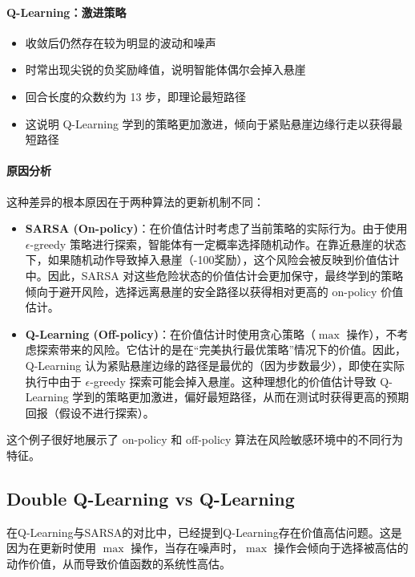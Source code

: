 \documentclass[oneside]{ctexbook}
\begin{document}
\paragraph{Q-Learning：激进策略}
\begin{itemize}
    \item 收敛后仍然存在较为明显的波动和噪声
    \item 时常出现尖锐的负奖励峰值，说明智能体偶尔会掉入悬崖
    \item 回合长度的众数约为 13 步，即理论最短路径
    \item 这说明 Q-Learning 学到的策略更加激进，倾向于紧贴悬崖边缘行走以获得最短路径
\end{itemize}

\paragraph{原因分析}

这种差异的根本原因在于两种算法的更新机制不同：

\begin{itemize}
    \item \textbf{SARSA (On-policy)}：在价值估计时考虑了当前策略的实际行为。由于使用 $\epsilon$-greedy 策略进行探索，智能体有一定概率选择随机动作。在靠近悬崖的状态下，如果随机动作导致掉入悬崖（-100奖励），这个风险会被反映到价值估计中。因此，SARSA 对这些危险状态的价值估计会更加保守，最终学到的策略倾向于避开风险，选择远离悬崖的安全路径以获得相对更高的 on-policy 价值估计。
    
    \item \textbf{Q-Learning (Off-policy)}：在价值估计时使用贪心策略（$\max$ 操作），不考虑探索带来的风险。它估计的是在“完美执行最优策略”情况下的价值。因此，Q-Learning 认为紧贴悬崖边缘的路径是最优的（因为步数最少），即使在实际执行中由于 $\epsilon$-greedy 探索可能会掉入悬崖。这种理想化的价值估计导致 Q-Learning 学到的策略更加激进，偏好最短路径，从而在测试时获得更高的预期回报（假设不进行探索）。
\end{itemize}

这个例子很好地展示了 on-policy 和 off-policy 算法在风险敏感环境中的不同行为特征。

\subsection{Double Q-Learning vs Q-Learning}

在Q-Learning与SARSA的对比中，已经提到Q-Learning存在价值高估问题。这是因为在更新时使用 $\max$ 操作，当存在噪声时，$\max$ 操作会倾向于选择被高估的动作价值，从而导致价值函数的系统性高估。
\end{document}
